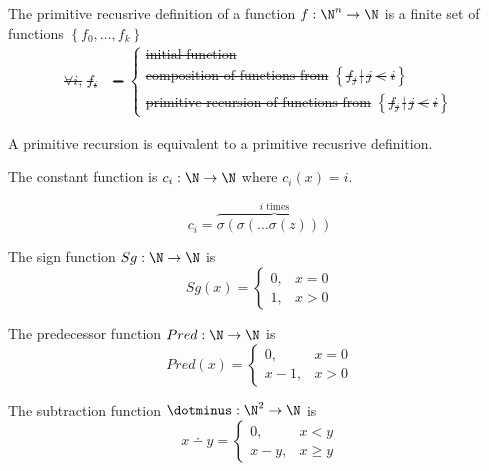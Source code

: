 \documentclass{article}
\begin{document}
\begin{definition}
    The primitive recusrive definition of a function
    \(f:\N^n\to\N\) is a finite set of functions \(\left\{f_0,\ldots,f_k\right\}\) \st
    \begin{align*}
        \forall i,\, f_i &= \begin{cases}
            \text{initial function} \\
            \text{composition of functions from } \left\{ f_j \,|\, j < i \right\} \\
            \text{primitive recursion of functions from } \left\{ f_j \,|\, j < i \right\}
        \end{cases} 
    \end{align*}
\end{definition}
\begin{theorem}
    A primitive recursion is equivalent to a primitive recusrive definition.
\end{theorem}
\begin{theorem}
    The constant function is \(c_i:\N\to\N\) where
    \(c_i(x)=i\).
    
    \[
        c_i=\overbrace{
            \sigma\left( \sigma\left(  \ldots \sigma\left( z \right) \right) \right)
        }^{i \text{ times}}
    \]
\end{theorem}
\begin{theorem}
    The sign function \(Sg:\N\to\N\) is
    \begin{equation*}
        Sg(x) = \begin{cases}
            0, & x = 0 \\
            1, & x > 0
        \end{cases}
    \end{equation*}
\end{theorem}
\begin{theorem}
    The predecessor function \(Pred:\N\to\N\) is
    \begin{equation*}
        Pred(x) = \begin{cases}
            0  , & x = 0 \\
            x-1, & x > 0
        \end{cases}
    \end{equation*}
\end{theorem}
\begin{theorem}
    The subtraction function \(\dotminus:\N^2\to\N\) is
    \begin{equation*}
        x\dotminus y = \begin{cases}
            0  , & x < y \\
            x-y, & x \ge y
        \end{cases}
    \end{equation*}
\end{theorem}
\end{document}
